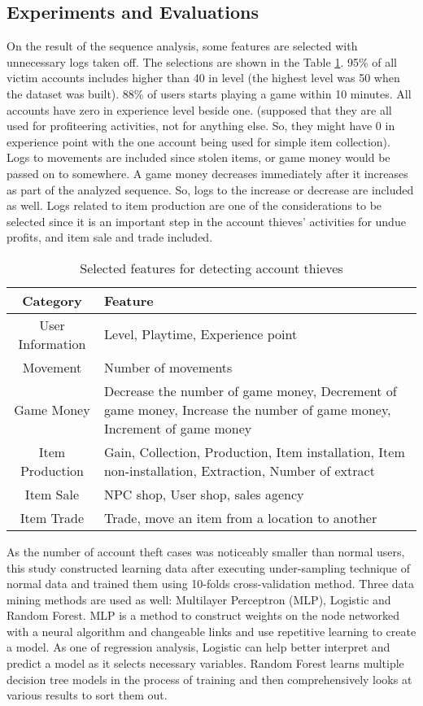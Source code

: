 \documentclass[conference]{IEEEtran}
\begin{document}
\subsection{Experiments and Evaluations}
On the result of the sequence analysis, some features are selected with unnecessary logs taken off. The selections are shown in the Table \ref{table:table3}. 95\% of all victim accounts includes higher than 40 in level (the highest level was 50 when the dataset was built). 88\% of users starts playing a game within 10 minutes. All accounts have zero in experience level beside one. (supposed that they are all used for profiteering activities, not for anything else. So, they might have 0 in experience point with the one account being used for simple item collection). Logs to movements are included since stolen items, or game money would be passed on to somewhere. A game money decreases immediately after it increases as part of the analyzed sequence. So, logs to the increase or decrease are included as well. Logs related to item production are one of the considerations to be selected since it is an important step in the account thieves' activities for undue profits, and item sale and trade included.


\begin{table}
\centering
\caption{Selected features for detecting account thieves}
\label{table:table3} 

\begin{tabular}{| c |m{5.5cm} |}
 \hline
 {\bfseries Category} & {\bfseries Feature}  \\   \hline 
 User Information & Level, Playtime, Experience point\\   \hline 
 Movement         & Number of movements \\   \hline
 Game Money    & Decrease the number of game money, Decrement of game money, Increase the number of game money, Increment of game money \\   \hline
 Item Production & Gain, Collection, Production, Item installation, Item non-installation, Extraction, Number of extract \\   \hline 
 Item Sale         & NPC shop, User shop, sales agency  \\   \hline 
 Item Trade       & Trade, move an item from a location to another  \\   \hline 
\end{tabular} 
\end{table}


As the number of account theft cases was noticeably smaller than normal users, this study constructed learning data after executing under-sampling technique of normal data and trained them using 10-folds cross-validation method. Three data mining methods are used as well: Multilayer Perceptron (MLP), Logistic and Random Forest. MLP is a method to construct weights on the node networked with a neural algorithm and changeable links and use repetitive learning to create a model. As one of regression analysis, Logistic can help better interpret and predict a model as it selects necessary variables. Random Forest learns multiple decision tree models in the process of training and then comprehensively looks at various results to sort them out. 
\end{document}
